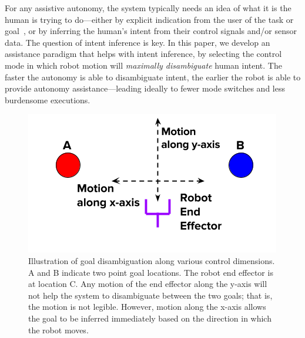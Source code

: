 \documentclass[conference]{IEEEtran}
\begin{document}
For any assistive autonomy, the system typically needs an idea of what it is the human is trying to do---either by explicit indication from the user of the task or goal~\cite{choi2008laser}, or by inferring the human's intent from their control signals and/or sensor data. The question of intent inference is key. In this paper, we develop an assistance paradigm that helps with intent inference, by selecting the control mode in which robot motion will \textit{maximally disambiguate} human intent. The faster the autonomy is able to disambiguate intent, the earlier the robot is able to provide autonomy assistance---leading ideally to fewer mode switches and less burdensome executions. 

\begin{figure}[t]
	\centering
	\includegraphics[width = 1.0\hsize]{./figures/DE_NEW.png}
	\vspace{-0.7cm}
	\caption{Illustration of goal disambiguation along various control dimensions. A and B indicate two point goal locations. The robot end effector is at location C. Any motion of the end effector along the y-axis will not help the system to disambiguate between the two goals; that is, the motion is not legible. However, motion along the x-axis allows the goal to be inferred immediately based on the direction in which the robot moves. }
	\label{DE}
\end{figure}
\end{document}
